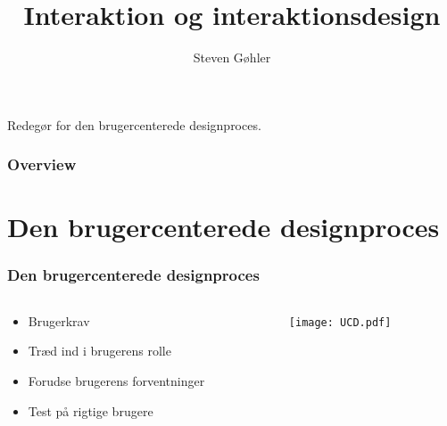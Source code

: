 \documentclass{beamer}
\title{Interaktion og interaktionsdesign}
\author{Steven Gøhler}
\begin{document}
\begin{frame}
\titlepage
Redegør for den brugercenterede designproces.
\end{frame}

\begin{frame}
  \frametitle{Overview}
  \tableofcontents
\end{frame}

\section{Den brugercenterede designproces}
\begin{frame}
  \frametitle{Den brugercenterede designproces}
  \begin{columns}[T]
    \begin{column}{.5\textwidth}
	  \begin{itemize}
		\item Brugerkrav
		\item Træd ind i brugerens rolle
		\item Forudse brugerens forventninger
		\item Test på rigtige brugere
	  \end{itemize}
    \end{column}
    \begin{column}{.5\textwidth}
      \texttt{[image: UCD.pdf]}
    \end{column}
  \end{columns}
\end{frame}
\end{document}
